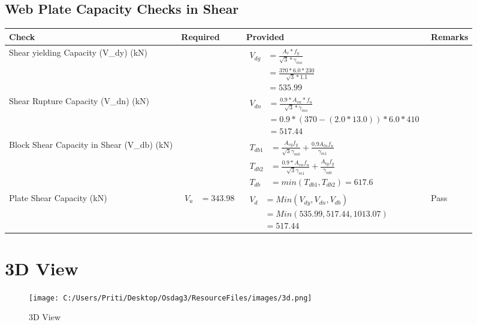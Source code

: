 \documentclass{article}%
\begin{document}
\subsection{Web Plate Capacity Checks in Shear}%
\label{subsec:WebPlateCapacityChecksinShear}%
\renewcommand{\arraystretch}{1.2}%
\begin{longtable}{|p{4cm}|p{6cm}|p{5.5cm}|p{1.5cm}|}%
\hline%
\rowcolor{OsdagGreen}%
Check&Required&Provided&Remarks\\%
\hline%
\endhead%
\hline%
Shear yielding Capacity (V\_dy) (kN)&&$\begin{aligned} V_{dg} &= \frac{A_v*f_y}{\sqrt{3}*\gamma_{mo}}\\ &=\frac{370*6.0*230}{\sqrt{3}*1.1}\\ &=535.99\end{aligned}$&\\%
\hline%
Shear Rupture Capacity (V\_dn) (kN)&&$\begin{aligned} V_{dn} &= \frac{0.9*A_{vn}*f_u}{\sqrt{3}*\gamma_{mo}}\\ &=0.9*(370-(2.0*13.0))*6.0*410\\ &=517.44\end{aligned}$&\\%
\hline%
Block Shear Capacity in Shear (V\_db) (kN)&&$\begin{aligned}T_{db1} &= \frac{A_{vg} f_{y}}{\sqrt{3} \gamma_{m0}} + \frac{0.9 A_{tn} f_{u}}{\gamma_{m1}}\\ T_{db2} &= \frac{0.9*A_{vn} f_{u}}{\sqrt{3} \gamma_{m1}} + \frac{A_{tg} f_{y}}{\gamma_{m0}}\\ T_{db} &= min(T_{db1}, T_{db2})= 617.6\end{aligned}$&\\%
\hline%
Plate Shear Capacity (kN)&$\begin{aligned} V_u &=343.98 \end{aligned}$&$\begin{aligned} V_d &= Min(V_{dy},V_{dn},V_{db})\\ &= Min(535.99,517.44,1013.07)\\ &=517.44\end{aligned}$&Pass\\%
\hline%
\end{longtable}

%
%
\newpage%
\section{3D View}%
\label{sec:3DView}%


\begin{figure}[h!]%
\centering%
\texttt{[image: C:/Users/Priti/Desktop/Osdag3/ResourceFiles/images/3d.png]}%
\caption{3D View}%
\end{figure}

%
\end{document}

